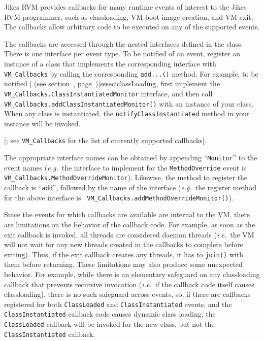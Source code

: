 
%
%
Jikes\TMweb{} RVM provides callbacks for many runtime events of
interest to the Jikes RVM 
programmer, such as classloading, VM boot image creation, and VM exit.  The
callbacks allow arbitrary code to be executed on any of the supported events.

The callbacks are accessed through the nested interfaces defined in the 
class.  There is one interface per event type.  To be notified
of an event, register an instance of a class that implements the corresponding
interface with {\tt VM\_Callbacks} by calling the corresponding {\tt add...()}
method.  For example, to be notified [ (see section~\Ref, page~\Pageref{})]{sssec:classLoading}, first implement the {\tt
VM\_Callbacks.ClassInstantiatedMonitor} interface, and then call {\tt
VM\_\-Call\-backs.add\-Class\-In\-stan\-ti\-a\-ted\-Mon\-i\-tor()} with an instance of your class.
When any class is instantiated, the {\tt notifyClassInstantiated} method in
your instance will be invoked.

[; see 
{\tt VM\_Callbacks} for the list of currently
supported callbacks]{\VMCallbacksURL}.

The appropriate interface names can be obtained by appending ``\texttt{Monitor}'' to the
event names ({\it e.g.}\ the interface to implement for the {\tt MethodOverride} event
is {\tt VM\_\-Call\-backs.Me\-thod\-Ov\-er\-ride\-Mo\-ni\-tor}).  Likewise, the method to
register the callback is ``\texttt{add}'', followed by the name of the
interface ({\it e.g.}\ the register method for the above interface is {\tt
VM\_\-Call\-backs.add\-Me\-thod\-O\-ver\-ride\-Mon\-i\-tor()}).

Since the events for which callbacks are available are internal to the VM,
there are limitations on the behavior of the callback code.  For
example, as soon as the exit callback is invoked, all threads are considered
daemon threads ({\it i.e.}\ the VM will not wait for any new threads created in the
callbacks to complete before exiting).  Thus, if the exit callback creates any
threads, it has to {\tt join()} with them before returning.  These limitations
may also produce some unexpected behavior.  For example, while there is an
elementary safeguard on any classloading callback that prevents recursive
invocation ({\it i.e.}\ if the callback code itself causes classloading), there is no
such safeguard across events, so, if there are callbacks registered for both
{\tt ClassLoaded} and {\tt Class\-In\-stan\-ti\-a\-ted} events, and the {\tt
Class\-In\-stan\-ti\-a\-ted} callback code causes dynamic class loading, the {\tt
ClassLoaded} callback will be invoked for the new class, but not the {\tt
Class\-In\-stan\-ti\-a\-ted} callback.

